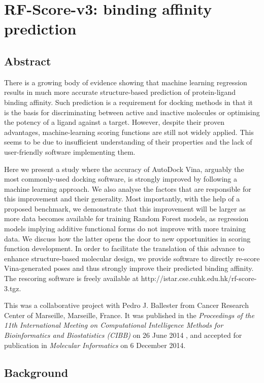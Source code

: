 \chapter{RF-Score-v3: binding affinity prediction}
\label{rfscore3}

\section{Abstract}

There is a growing body of evidence showing that machine learning regression results in much more accurate structure-based prediction of protein-ligand binding affinity. Such prediction is a requirement for docking methods in that it is the basis for discriminating between active and inactive molecules or optimising the potency of a ligand against a target. However, despite their proven advantages, machine-learning scoring functions are still not widely applied. This seems to be due to insufficient understanding of their properties and the lack of user-friendly software implementing them.

Here we present a study where the accuracy of AutoDock Vina, arguably the most commonly-used docking software, is strongly improved by following a machine learning approach. We also analyse the factors that are responsible for this improvement and their generality. Most importantly, with the help of a proposed benchmark, we demonstrate that this improvement will be larger as more data becomes available for training Random Forest models, as regression models implying additive functional forms do not improve with more training data. We discuss how the latter opens the door to new opportunities in scoring function development. In order to facilitate the translation of this advance to enhance structure-based molecular design, we provide software to directly re-score Vina-generated poses and thus strongly improve their predicted binding affinity. The rescoring software is freely available at http://istar.cse.cuhk.edu.hk/rf-score-3.tgz.

This was a collaborative project with Pedro J. Ballester from Cancer Research Center of Marseille, Marseille, France. It was published in the \textit{Proceedings of the 11th International Meeting on Computational Intelligence Methods for Bioinformatics and Biostatistics (CIBB)} on 26 June 2014 \citep{1433}, and accepted for publication in \textit{Molecular Informatics} on 6 December 2014.

\section{Background}

